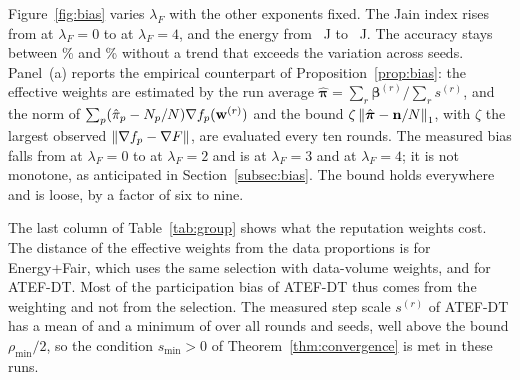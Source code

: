 \begin{revblock}Figure~\ref{fig:bias} varies $\lambda_F$ with the other exponents fixed. The Jain index rises from  at $\lambda_F=0$ to  at $\lambda_F=4$, and the energy from ~J to ~J. The accuracy stays between \% and \% without a trend that exceeds the variation across seeds. Panel~(a) reports the empirical counterpart of Proposition~\ref{prop:bias}: the effective weights are estimated by the run average $\hat{\boldsymbol{\pi}}=\sum_r\boldsymbol{\beta}^{(r)}/\sum_r s^{(r)}$, and the norm of $\sum_p(\hat\pi_p-N_p/N)\nabla f_p(\mathbf{w}^{(r)})$ and the bound $\zeta\left\lVert \hat{\boldsymbol{\pi}}-\mathbf{n}/N \right\rVert_1$, with $\zeta$ the largest observed $\left\lVert \nabla f_p-\nabla F \right\rVert$, are evaluated every ten rounds. The measured bias falls from  at $\lambda_F=0$ to  at $\lambda_F=2$ and is  at $\lambda_F=3$ and  at $\lambda_F=4$; it is not monotone, as anticipated in Section~\ref{subsec:bias}. The bound holds everywhere and is loose, by a factor of six to nine.

The last column of Table~\ref{tab:group} shows what the reputation weights cost. The distance of the effective weights from the data proportions is  for Energy+Fair, which uses the same selection with data-volume weights, and  for ATEF-DT. Most of the participation bias of ATEF-DT thus comes from the weighting and not from the selection. The measured step scale $s^{(r)}$ of ATEF-DT has a mean of  and a minimum of  over all rounds and seeds, well above the bound $\rho_{\min}/2$, so the condition $s_{\min}>0$ of Theorem~\ref{thm:convergence} is met in these runs.\end{revblock}

